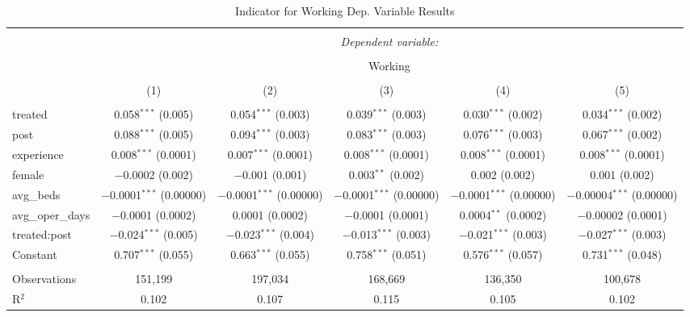 
\begin{table}[!htbp] \centering 
  \caption{Indicator for Working Dep. Variable Results} 
  \label{} 
\small 
\begin{tabular}{@{\extracolsep{3pt}}lccccc} 
\\[-1.8ex]\hline 
\hline \\[-1.8ex] 
 & \multicolumn{5}{c}{\textit{Dependent variable:}} \\ 
\cline{2-6} 
\\[-1.8ex] & \multicolumn{5}{c}{Working} \\ 
\\[-1.8ex] & (1) & (2) & (3) & (4) & (5)\\ 
\hline \\[-1.8ex] 
 treated & 0.058$^{***}$ (0.005) & 0.054$^{***}$ (0.003) & 0.039$^{***}$ (0.003) & 0.030$^{***}$ (0.002) & 0.034$^{***}$ (0.002) \\ 
  post & 0.088$^{***}$ (0.005) & 0.094$^{***}$ (0.003) & 0.083$^{***}$ (0.003) & 0.076$^{***}$ (0.003) & 0.067$^{***}$ (0.002) \\ 
  experience & 0.008$^{***}$ (0.0001) & 0.007$^{***}$ (0.0001) & 0.008$^{***}$ (0.0001) & 0.008$^{***}$ (0.0001) & 0.008$^{***}$ (0.0001) \\ 
  female & $-$0.0002 (0.002) & $-$0.001 (0.001) & 0.003$^{**}$ (0.002) & 0.002 (0.002) & 0.001 (0.002) \\ 
  avg\_beds & $-$0.0001$^{***}$ (0.00000) & $-$0.0001$^{***}$ (0.00000) & $-$0.0001$^{***}$ (0.00000) & $-$0.0001$^{***}$ (0.00000) & $-$0.00004$^{***}$ (0.00000) \\ 
  avg\_oper\_days & $-$0.0001 (0.0002) & 0.0001 (0.0002) & $-$0.0001 (0.0001) & 0.0004$^{**}$ (0.0002) & $-$0.00002 (0.0001) \\ 
  treated:post & $-$0.024$^{***}$ (0.005) & $-$0.023$^{***}$ (0.004) & $-$0.013$^{***}$ (0.003) & $-$0.021$^{***}$ (0.003) & $-$0.027$^{***}$ (0.003) \\ 
  Constant & 0.707$^{***}$ (0.055) & 0.663$^{***}$ (0.055) & 0.758$^{***}$ (0.051) & 0.576$^{***}$ (0.057) & 0.731$^{***}$ (0.048) \\ 
 \hline \\[-1.8ex] 
Observations & 151,199 & 197,034 & 168,669 & 136,350 & 100,678 \\ 
R$^{2}$ & 0.102 & 0.107 & 0.115 & 0.105 & 0.102 \\ 

\end{tabular}
\end{table}
